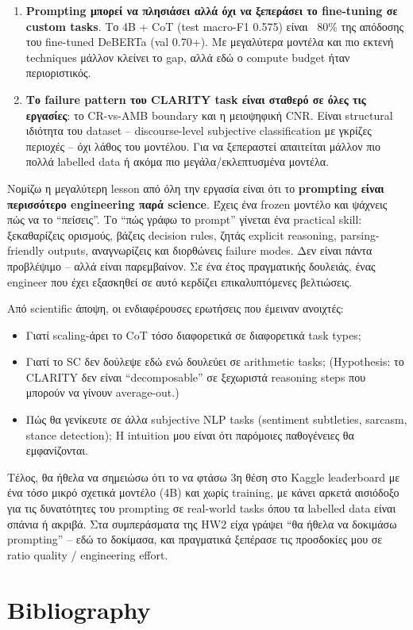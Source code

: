 \documentclass[12pt]{fphw}
\begin{document}
\begin{enumerate}
    \item \textbf{Prompting μπορεί να πλησιάσει αλλά όχι να ξεπεράσει το fine-tuning σε custom tasks}. Το 4B + CoT (test macro-F1 0.575) είναι ~80\% της απόδοσης του fine-tuned DeBERTa (val 0.70+). Με μεγαλύτερα μοντέλα και πιο εκτενή techniques μάλλον κλείνει το gap, αλλά εδώ ο compute budget ήταν περιοριστικός.

    \item \textbf{Το failure pattern του CLARITY task είναι σταθερό σε όλες τις εργασίες}: το CR-vs-AMB boundary και η μειοψηφική CNR. Είναι structural ιδιότητα του dataset -- discourse-level subjective classification με γκρίζες περιοχές -- όχι λάθος του μοντέλου. Για να ξεπεραστεί απαιτείται μάλλον πιο πολλά labelled data ή ακόμα πιο μεγάλα/εκλεπτυσμένα μοντέλα.
\end{enumerate}

Νομίζω η μεγαλύτερη lesson από όλη την εργασία είναι ότι το \textbf{prompting είναι περισσότερο engineering παρά science}. Έχεις ένα frozen μοντέλο και ψάχνεις πώς να το ``πείσεις''. Το ``πώς γράφω το prompt'' γίνεται ένα practical skill: ξεκαθαρίζεις ορισμούς, βάζεις decision rules, ζητάς explicit reasoning, parsing-friendly outputs, αναγνωρίζεις και διορθώνεις failure modes. Δεν είναι πάντα προβλέψιμο -- αλλά είναι παρεμβαίνον. Σε ένα έτος πραγματικής δουλειάς, ένας engineer που έχει εξασκηθεί σε αυτό κερδίζει επικαλυπτόμενες βελτιώσεις.

Από scientific άποψη, οι ενδιαφέρουσες ερωτήσεις που έμειναν ανοιχτές:

\begin{itemize}
    \item Γιατί scaling-άρει το CoT τόσο διαφορετικά σε διαφορετικά task types;
    \item Γιατί το SC δεν δούλεψε εδώ ενώ δουλεύει σε arithmetic tasks; (Hypothesis: το CLARITY δεν είναι ``decomposable'' σε ξεχωριστά reasoning steps που μπορούν να γίνουν average-out.)
    \item Πώς θα γενίκευτε σε άλλα subjective NLP tasks (sentiment subtleties, sarcasm, stance detection); Η intuition μου είναι ότι παρόμοιες παθογένειες θα εμφανίζονται.
\end{itemize}

Τέλος, θα ήθελα να σημειώσω ότι το να φτάσω 3η θέση στο Kaggle leaderboard με ένα τόσο μικρό σχετικά μοντέλο (4B) και χωρίς training, με κάνει αρκετά αισιόδοξο για τις δυνατότητες του prompting σε real-world tasks όπου τα labelled data είναι σπάνια ή ακριβά. Στα συμπεράσματα της HW2 είχα γράψει ``θα ήθελα να δοκιμάσω prompting'' -- εδώ το δοκίμασα, και πραγματικά ξεπέρασε τις προσδοκίες μου σε ratio quality / engineering effort.

\section{Bibliography}



\end{document}
